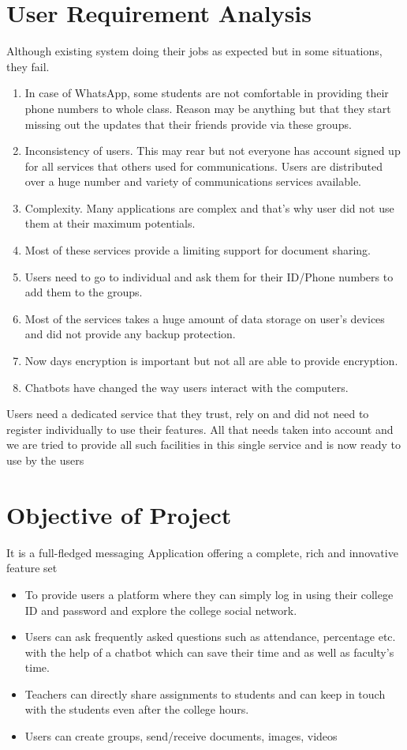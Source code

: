\section{User Requirement Analysis}
Although existing system doing their jobs as expected but in some situations, they fail.
\begin{enumerate}
\item In case of WhatsApp, some students are not comfortable in providing their phone numbers to whole
class. Reason may be anything but that they start missing out the updates that their friends provide
via these groups.
\item Inconsistency of users. This may rear but not everyone has account signed up for all services that
others used for communications. Users are distributed over a huge number and variety of
communications services available.
\item Complexity. Many applications are complex and that’s why user did not use them at their maximum
potentials.
\item Most of these services provide a limiting support for document sharing.
\item Users need to go to individual and ask them for their ID/Phone numbers to add them to the groups.
\item Most of the services takes a huge amount of data storage on user’s devices and did not provide any
backup protection.
\item Now days encryption is important but not all are able to provide encryption.
\item Chatbots have changed the way users interact with the computers.
\end{enumerate}
Users need a dedicated service that they trust, rely on and did not need to register individually to use their
features. All that needs taken into account and we are tried to provide all such facilities in this single service
and is now ready to use by the users


\section{Objective of Project }
It is a full-fledged messaging Application offering a complete, rich and innovative feature set
\begin{itemize}
\item To provide users a platform where they can simply log in using their college ID and password and
explore the college social network.
\item Users can ask frequently asked questions such as attendance, percentage etc. with the help of a
chatbot which can save their time and as well as faculty’s time.
\item Teachers can directly share assignments to students and can keep in touch with the students even
after the college hours.
\item Users can create groups, send/receive documents, images, videos
\end{itemize}